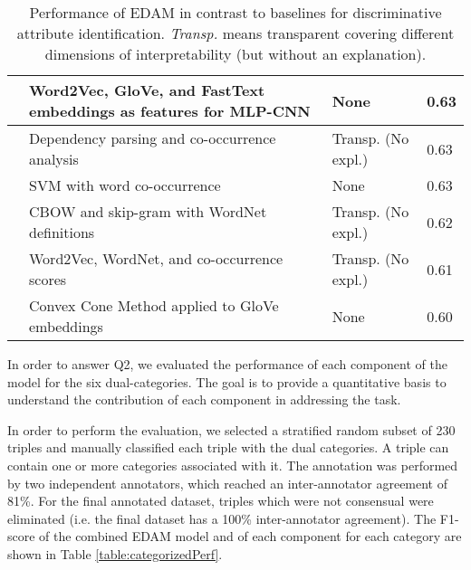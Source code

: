 \documentclass[11pt,a4paper]{article}
\begin{document}
\begin{table*}
\begin{center}
\begin{tabularx}{\textwidth}{ |p{}|p{}|p{}|p{}| }
            \hline
            \cite{thungn}&Word2Vec, GloVe, and FastText embeddings as features for MLP-CNN&None&0.63\\
            \hline
     		\cite{citiusnlp}&Dependency parsing and co-occurrence analysis& Transp. (No expl.) &0.63\\
            \hline
            \cite{alb}&SVM with word co-occurrence&None&0.63\\
            \hline
            \cite{abdn}&CBOW and skip-gram with WordNet definitions& Transp. (No expl.)& 0.62\\
            \hline
            \cite{unbnlp}&Word2Vec, WordNet, and co-occurrence scores&Transp. (No expl.) &0.61\\
            \hline
            \cite{unam}&Convex Cone Method applied to GloVe embeddings&None&0.60\\
     		\hline
		\end{tabularx}
    \end{center}
    \caption{Performance of EDAM in contrast to baselines for discriminative attribute identification. \textit{Transp.} means transparent covering different dimensions of interpretability \cite{VivianInterp} (but without an explanation).}
    \label{table:SemEvalResults}
\end{table*}

\normalsize

In order to answer Q2, we evaluated the performance of each component of the model for the six dual-categories. The goal is to provide a quantitative basis to understand the contribution of each component in addressing the task. 

In order to perform the evaluation, we selected a stratified random subset of 230 triples and manually classified each triple with the dual categories. A triple can contain one or more categories associated with it. The annotation was performed by two independent annotators, which reached an inter-annotator agreement of 81\%. For the final annotated dataset, triples which were not consensual were eliminated (i.e. the final dataset has a 100\% inter-annotator agreement). The F1-score of the combined EDAM model and of each component for each category are shown in Table \ref{table:categorizedPerf}. 
\end{document}
